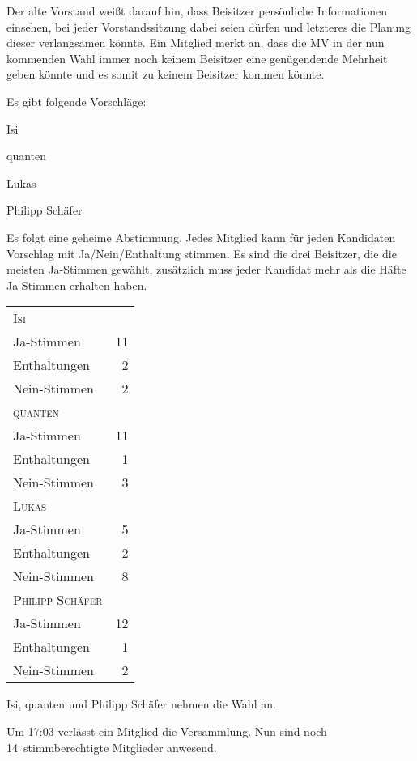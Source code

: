 \documentclass[DIV=calc,parksip=half*]{scrartcl}
\newcommand{\fiveop}{Philipp Schäfer}
\newcommand{\quanten}{quanten}
\newcommand{\isi}{Isi}
\begin{document}
Der alte Vorstand weißt darauf hin, dass Beisitzer persönliche Informationen einsehen, bei jeder Vorstandssitzung dabei seien dürfen und letzteres die Planung dieser verlangsamen könnte. Ein Mitglied merkt an, dass die MV in der nun kommenden Wahl immer noch keinem Beisitzer eine genügendende Mehrheit geben könnte und es somit zu keinem Beisitzer kommen könnte. 

Es gibt folgende Vorschläge:
\begin{compactitem}
 \item \isi{}
 \item \quanten{}
 \item Lukas
 \item \fiveop{}
\end{compactitem}

Es folgt eine geheime Abstimmung. Jedes Mitglied kann für jeden Kandidaten Vorschlag mit Ja/Nein/Enthaltung stimmen. Es sind die drei Beisitzer, die die meisten Ja-Stimmen gewählt, zusätzlich muss jeder Kandidat mehr als die Häfte Ja-Stimmen erhalten haben.

\begin{tabularx}{.9\linewidth}{Xr}
    \toprule
    \textsc{\isi{}}\\
    Ja-Stimmen & 11 \\
    Enthaltungen & 2 \\
    Nein-Stimmen & 2 \\
    \midrule
    \textsc{\quanten{}}\\
    Ja-Stimmen & 11 \\
    Enthaltungen & 1 \\
    Nein-Stimmen & 3 \\
    \midrule
    \textsc{Lukas}\\
    Ja-Stimmen & 5 \\
    Enthaltungen & 2 \\
    Nein-Stimmen & 8 \\
    \midrule
    \textsc{\fiveop{}}\\
    Ja-Stimmen & 12 \\
    Enthaltungen & 1 \\
    Nein-Stimmen & 2 \\
    \bottomrule
\end{tabularx}
\par

\isi{}, \quanten{} und \fiveop{} nehmen die Wahl an.


Um 17:03 verlässt ein Mitglied die Versammlung. Nun sind noch 14~stimmberechtigte Mitglieder anwesend.
\end{document}
